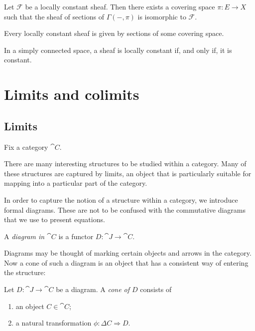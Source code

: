 \documentclass{article}
\begin{document}
\begin{theorem}
  Let $\mathscr F$ be a locally constant sheaf. Then there exists a covering
  space $\pi:E\to X$ such that the sheaf of sections of $\Gamma(-, \pi)$ is isomorphic to $\mathscr F$.
\end{theorem}

\begin{theorem}
  Every locally constant sheaf is given by sections of some covering space.
\end{theorem}

\begin{theorem}
  In a simply connected space, a sheaf is locally constant if, and only if,
  it is constant.
\end{theorem}

\section{Limits and colimits}

\subsection{Limits}

Fix a category $\cat{C}$.

There are many interesting structures to be studied within a category. Many of these
structures are captured by limits, an object that is particularly suitable
for mapping into a particular part of the category.

In order to capture the notion of a structure within a category, we introduce
formal diagrams. These are not to be confused with the commutative diagrams that
we use to present equations.

\begin{definition}
  A \emph{diagram in $\cat{C}$} is a functor $D:\cat{J}\to\cat{C}$.
\end{definition}

Diagrams may be thought of marking certain objects and arrows in the category.
Now a cone of such a diagram is an object that has a consistent way of entering
the structure:

\begin{definition}
  Let $D:\cat{J}\to\cat{C}$ be a diagram. A \emph{cone of $D$} consists of
  \begin{enumerate}
    \item an object $C\in\cat{C}$;
    \item a natural transformation $\phi:\Delta C\Rightarrow D$.
  \end{enumerate}
\end{definition}
\end{document}
